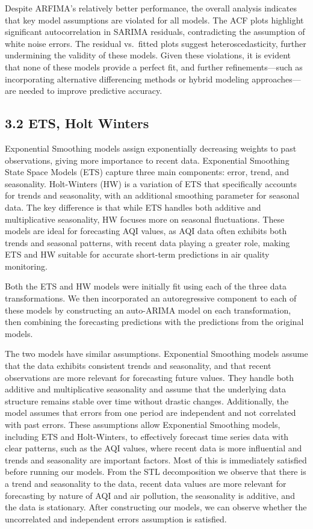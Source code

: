 \documentclass[
  12pt,
]{article}
\begin{document}
Despite ARFIMA's relatively better performance, the overall analysis
indicates that key model assumptions are violated for all models. The
ACF plots highlight significant autocorrelation in SARIMA residuals,
contradicting the assumption of white noise errors. The residual
vs.~fitted plots suggest heteroscedasticity, further undermining the
validity of these models. Given these violations, it is evident that
none of these models provide a perfect fit, and further
refinements---such as incorporating alternative differencing methods or
hybrid modeling approaches---are needed to improve predictive accuracy.

\subsection{3.2 ETS, Holt Winters}\label{ets-holt-winters}

Exponential Smoothing models assign exponentially decreasing weights to
past observations, giving more importance to recent data. Exponential
Smoothing State Space Models (ETS) capture three main components: error,
trend, and seasonality. Holt-Winters (HW) is a variation of ETS that
specifically accounts for trends and seasonality, with an additional
smoothing parameter for seasonal data. The key difference is that while
ETS handles both additive and multiplicative seasonality, HW focuses
more on seasonal fluctuations. These models are ideal for forecasting
AQI values, as AQI data often exhibits both trends and seasonal
patterns, with recent data playing a greater role, making ETS and HW
suitable for accurate short-term predictions in air quality monitoring.

Both the ETS and HW models were initially fit using each of the three
data transformations. We then incorporated an autoregressive component
to each of these models by constructing an auto-ARIMA model on each
transformation, then combining the forecasting predictions with the
predictions from the original models.

The two models have similar assumptions. Exponential Smoothing models
assume that the data exhibits consistent trends and seasonality, and
that recent observations are more relevant for forecasting future
values. They handle both additive and multiplicative seasonality and
assume that the underlying data structure remains stable over time
without drastic changes. Additionally, the model assumes that errors
from one period are independent and not correlated with past errors.
These assumptions allow Exponential Smoothing models, including ETS and
Holt-Winters, to effectively forecast time series data with clear
patterns, such as the AQI values, where recent data is more influential
and trends and seasonality are important factors. Most of this is
immediately satisfied before running our models. From the STL
decomposition we observe that there is a trend and seasonality to the
data, recent data values are more relevant for forecasting by nature of
AQI and air pollution, the seasonality is additive, and the data is
stationary. After constructing our models, we can observe whether the
uncorrelated and independent errors assumption is satisfied.
\end{document}
